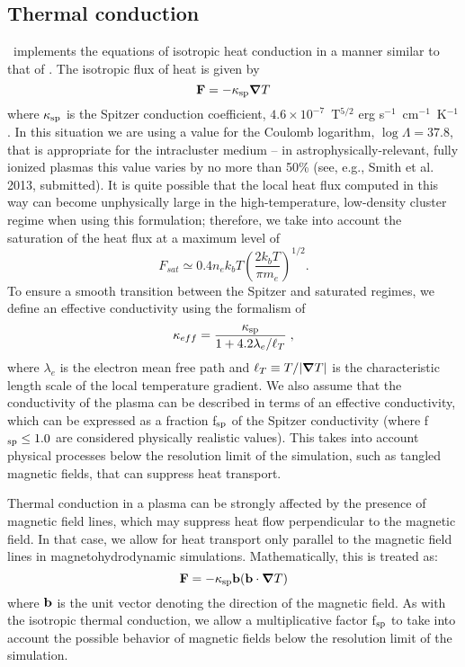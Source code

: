 \subsection{Thermal conduction}
\label{sec.num.conductions}

\enzo\ implements the equations of isotropic heat conduction in a manner
similar to that of \citet{2007ApJ...664..135P}.  
The isotropic flux of heat is given by
\begin{equation}
\myvec{F} = -\kappa_{\rm sp} \grad T
\end{equation}
where $\kappa_{\rm sp}$ is the Spitzer conduction coefficient, $4.6 \times 10^{-7}$~T$^{5/2}$ erg
s$^{-1}$~cm$^{-1}$~K$^{-1}$ \citep{1962pfig.book.....S}.  In this
situation we are using a
value for the Coulomb logarithm, $\log \Lambda = 37.8$, that is
appropriate for the intracluster medium \citep{1988xrec.book.....S} --
in astrophysically-relevant, fully ionized plasmas this value varies
by no more than 50\% (see, e.g., Smith et al. 2013, submitted).
It is quite possible that the local heat flux computed in this way 
can become unphysically large in
the high-temperature, low-density cluster regime when using this
formulation; therefore, we take into account the saturation of the heat
flux \citep{1977ApJ...211..135C} at a maximum level of
\begin{equation}
F_{sat} \simeq 0.4 n_e k_b T \left( \frac{2 k_b T}{\pi m_e} \right)^{1/2}.
\end{equation}
To ensure a smooth transition between
the Spitzer and saturated regimes, we define an effective
conductivity using the formalism of \citet{1988xrec.book.....S}
\begin{equation}
\kappa_{eff} = \frac{\kappa_{\rm sp}}{1 + 4.2 \lambda_e / \ell_T} \; ,
\end{equation}
where $\lambda_e$ is the electron mean free path and $\ell_T \equiv T
/ |\bm{\nabla} T|$ is the characteristic length scale of the local
temperature gradient.  We also assume that the conductivity of the
plasma can be described in terms of an effective conductivity, which
can be expressed as a fraction f$_{\rm sp}$ of the Spitzer conductivity
(where f$_{\rm sp} \leq 1.0$ are considered physically realistic values).  This takes
into account physical processes below the resolution limit of the
simulation, such as tangled magnetic fields, that can suppress heat
transport.

Thermal conduction in a plasma can be strongly affected by the
presence of magnetic field lines, which may suppress heat
flow perpendicular to the magnetic field.  In that case, we allow for
heat transport only parallel to the magnetic field lines in
magnetohydrodynamic simulations.  Mathematically, this is treated as:
\begin{equation}
\myvec{F} = -\kappa_{\rm sp} \myvec{b} (\myvec{b} \cdot \grad T)
\end{equation}
where $\mathbf{b}$ is the unit vector denoting the direction of the
magnetic field.  As with the isotropic thermal conduction, we allow a
multiplicative factor f$_{\rm sp}$ to take into account the possible
behavior of magnetic fields below the resolution limit of the
simulation.

